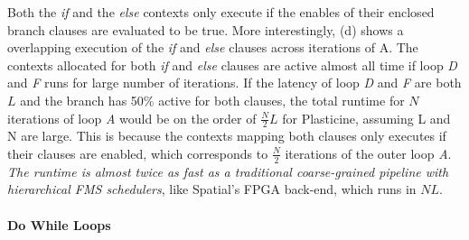Both the \emph{if} and the \emph{else} contexts only execute if the enables of their enclosed branch clauses are
evaluated to be true. More interestingly,  (d) shows a overlapping execution of the
\emph{if} and \emph{else} clauses across iterations of A. 
The contexts allocated for both \emph{if} and \emph{else} clauses are active almost all time if loop \emph{D}
and \emph{F} runs for large number of iterations.
If the latency of loop \emph{D} and \emph{F} are both $L$ and the branch has 50\% active for both clauses, 
the total runtime for $N$ iterations of loop \emph{A} would be on the order of $\frac{N}{2}L$
for Plasticine, assuming L and N are large.
This is because the contexts mapping both clauses only executes if their clauses are enabled, which
corresponds to $\frac{N}{2}$ iterations of the outer loop \emph{A}.
\emph{The runtime is almost twice as fast as a traditional coarse-grained pipeline with hierarchical FMS
schedulers}, like Spatial's FPGA back-end, which runs in $NL$.

\paragraph{Do While Loops}

